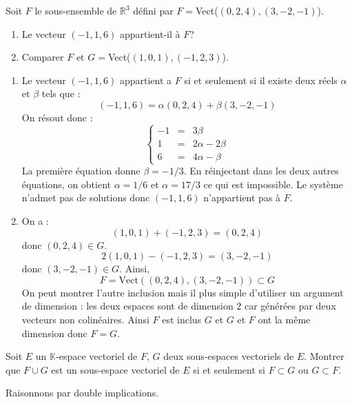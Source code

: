 \documentclass[a4paper,10pt]{report}
\begin{document}
\medskip



\begin{Exercice}{} Soit $F$ le sous-ensemble de $\mathbb{R}^3$ défini par $F=$Vect($(0,2,4), (3,-2,-1)$).
\begin{enumerate}
\item Le vecteur $(-1,1,6)$ appartient-il à $F$?
\item Comparer $F$ et $G=$Vect($(1,0,1), (-1,2,3)$).
\end{enumerate}
\end{Exercice}

\corr 
\begin{enumerate}
\item Le vecteur $(-1,1,6)$ appartient a $F$ si et seulement si il existe deux réels $\alpha$ et $\beta$ tels que :
$$ (-1,1,6) = \alpha (0,2,4) + \beta (3,-2,-1)$$
On résout donc :
$$ \left\lbrace \begin{array}{ccl}
-1 & = & 3 \beta \\
1 & = & 2 \alpha - 2 \beta \\
6 & = & 4 \alpha - \beta
\end{array}\right.$$
La première équation donne $\beta = -1/3$. En réinjectant dans les deux autres équations, on obtient $\alpha=1/6$ et $\alpha = 17/3$ ce qui est impossible. Le système n'admet pas de solutions donc $(-1,1,6)$ n'appartient pas à $F$.
\item On a :
$$ (1,0,1) + (-1,2,3) =(0,2,4)$$
donc $(0,2,4) \in G$.
$$ 2(1,0,1) -(-1,2,3) = (3,-2,-1)$$
donc $(3,-2,-1) \in G$. Ainsi,
$$ F=\textrm{Vect}((0,2,4), (3,-2,-1)) \subset G$$
On peut montrer l'autre inclusion mais il plus simple d'utiliser un argument de dimension : les deux espaces sont de dimension $2$ car générées par deux vecteurs non colinéaires. Ainsi $F$ est inclus $G$ et $G$ et $F$ ont la même dimension donc $F=G$.
\end{enumerate}

\medskip

\begin{Exercice}{} Soit $E$ un $\mathbb{K}$-espace vectoriel de $F$, $G$ deux sous-espaces vectoriels de $E$. Montrer que $F \cup G$ est un sous-espace vectoriel de $E$ si et seulement si $F \subset G$ ou $G \subset F$.
\end{Exercice}

\corr Raisonnons par double implications.
\end{document}
